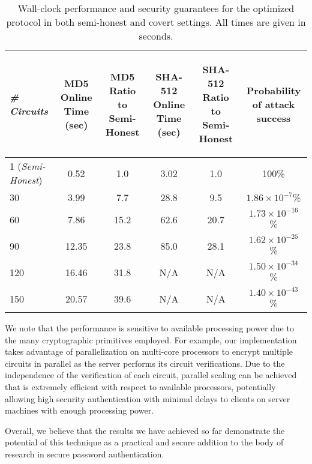 \begin{table}[t]
\centering
\begin{tabular}{|l|c|c|c|c|c|}
\hline
{\it \# Circuits} & 
{\it \parbox[t]{0.8in}{MD5 Online Time (sec)}} & {\it \parbox[t]{0.9in}{MD5 Ratio to Semi-Honest}} & 
{\it \parbox[t]{1in}{SHA-512 Online Time (sec)}} & {\it \parbox[t]{1in}{SHA-512 Ratio to Semi-Honest}} & 
{\it \parbox[t]{0.9in}{Probability of attack success}} \\
\hline\hline
1 ({\it Semi-Honest}) & 0.52 & 1.0 & 3.02 & 1.0 & 100\% \\
\hline
30 & 3.99 & 7.7 & 28.8 & 9.5 & $1.86 \times 10^{-7}$\% \\
\hline
60 & 7.86 & 15.2 & 62.6 & 20.7 & $1.73 \times 10^{-16}$\% \\
\hline
90 & 12.35 & 23.8 & 85.0 & 28.1 & $1.62 \times 10^{-25}$\% \\
\hline
120 & 16.46 & 31.8 & N/A & N/A & $1.50 \times 10^{-34}$\% \\
\hline
150 & 20.57 & 39.6 & N/A & N/A & $1.40 \times 10^{-43}$\% \\
\hline
\end{tabular}
\vspace{1em}
\caption{Wall-clock performance and security guarantees for the
optimized protocol in both semi-honest and covert settings. All times
are given in seconds.}
\label{table:performance}
\end{table}

We note that the performance is sensitive to available processing
power due to the many cryptographic primitives employed.  For example,
our implementation takes advantage of parallelization on multi-core
processors to encrypt multiple circuits in parallel as the server
performs its circuit verifications.  Due to the independence
of the verification of each circuit, parallel scaling can be achieved that
is extremely efficient with respect to available processors, potentially
allowing high security authentication with minimal delays to clients on 
server machines with enough processing power.

Overall, we believe that the results we have achieved so far
demonstrate the potential of this technique as a practical and secure
addition to the body of research in secure password authentication.
